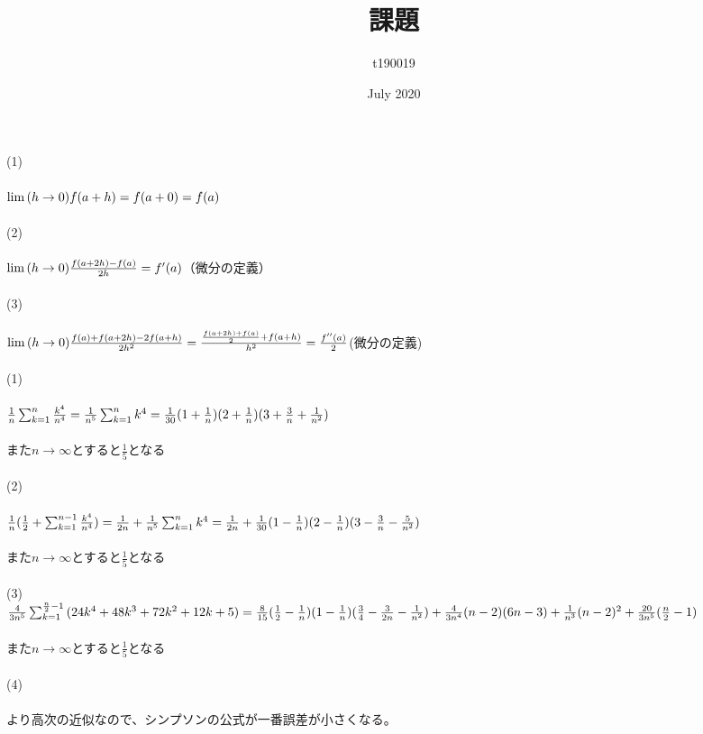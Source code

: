 \documentclass{article}
\title{課題}
\author{t190019 }
\date{July 2020}
\begin{document}
\maketitle{}
(1)\\\\
$\lim{(h\to0)}f(a+h)\\\\
=f(a+0)=f(a)$\\\\
(2)\\\\
$\lim{(h\to0)}\frac{f(a+2h)-f(a)}{2h}\\\\
=f'(a)$（微分の定義）\\\\
(3)\\\\
$\lim{(h\to0)}\frac{f(a)+f(a+2h)-2f(a+h)}{2h^{2}}\\\\
=\frac{\frac{f(a+2h)+f(a)}{2}+f(a+h)}{h^{2}}\\\\
=\frac{f''(a)}{2}$(微分の定義)\\\\
(1)\\\\
$\frac{1}{n}\sum_{k=1}^{n}{\frac{k^{4}}{n^{4}}}\\\\
=\frac{1}{n^{5}}\sum_{k=1}^{n}{k^{4}\\\\
=\frac{1}{30}(1+\frac{1}{n})(2+\frac{1}{n})(3+\frac{3}{n}+\frac{1}{n^{2}})}$\\\\
また$n\to \infty$とすると$\frac{1}{5}$となる\\\\
(2)\\\\
$\frac{1}{n}(\frac{1}{2}+\sum_{k=1}^{n-1}{\frac{k^{4}}{n^{4}}})\\\\
=\frac{1}{2n}+\frac{1}{n^{5}}\sum_{k=1}^{n}{k^{4}\\\\
=\frac{1}{2n}+\frac{1}{30}(1-\frac{1}{n})(2-\frac{1}{n})(3-\frac{3}{n}-\frac{5}{n^{2}})}$\\\\
また$n\to \infty$とすると$\frac{1}{5}$となる\\\\
(3)\\$\frac{4}{3n^{5}}\sum_{k=1}^{\frac{n}{2}-1}{(24k^{4}+48k^{3}+72k^{2}+12k+5)}\\\\
=\frac{8}{15}(\frac{1}{2}-\frac{1}{n})(1-\frac{1}{n})(\frac{3}{4}-\frac{3}{2n}-\frac{1}{n^{2}})+\frac{4}{3n^{4}}(n-2)(6n-3)+\frac{1}{n^{3}}(n-2)^{2}+\frac{20}{3n^{5}}(\frac{n}{2}-1)$\\\\
また$n\to \infty$とすると$\frac{1}{5}$となる\\\\
(4)\\\\
より高次の近似なので、シンプソンの公式が一番誤差が小さくなる。
\end{document}
